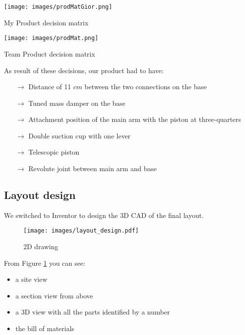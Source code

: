 \documentclass[11pt,a4paper]{article}
\begin{document}
	\begin{table}[H]
		\centering
		\texttt{[image: images/prodMatGior.png]}
		\caption{My Product decision matrix}
		\label{My Product decision matrix}
	\end{table}

	\begin{table}[H]
		\centering
		\texttt{[image: images/prodMat.png]}
		\caption{Team Product decision matrix}
		\label{Team Product decision matrix}
	\end{table}
	\newpage	
	As result of these decisions, our product had to have:
	\begin{itemize}
		\item[$\rightarrow$] Distance of 11 $cm$ between the two connections on the base
		\item[$\rightarrow$] Tuned mass damper on the base
		\item[$\rightarrow$] Attachment position of the main arm with the piston at three-quarters
		\item[$\rightarrow$] Double suction cup with one lever
		\item[$\rightarrow$] Telescopic piston
		\item[$\rightarrow$] Revolute joint between main arm and base
	\end{itemize} 
\subsection{Layout design}
	We switched to Inventor to design the 3D CAD of the final layout.
	
	\begin{figure}[H]
		\centering
		\texttt{[image: images/layout\_design.pdf]}
		\caption{2D drawing}
		\label{2D}
	\end{figure}
	
	
	From Figure \ref{2D} you can see:
	\begin{itemize}
	\item a site view
	\item a section view from above
	\item a 3D view with all the parts identified by a number
	\item the bill of materials 	
	\end{itemize}

	\newpage
	
\end{document}
